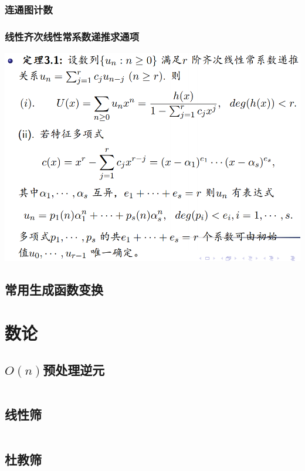 \documentclass[a4paper, twoside]{article}
\begin{document}
\begin{multicols}{2}
				\subsubsection{连通图计数}
					

				\subsubsection{线性齐次线性常系数递推求通项}
					\includegraphics[scale = 0.265]{../src/math/线性齐次线性常系数递推.png}
			
			\subsection{常用生成函数变换}
				

		\newpage
		\section{数论}

			\subsection{$O(n)$预处理逆元}
				\inputminted{cpp}{../src/numbertheory/O(n)求逆元.cpp}

			\subsection{线性筛}
				\inputminted{cpp}{../src/numbertheory/扩展线性筛.cpp}

			\subsection{杜教筛}
				
			

\end{multicols}
\end{document}

